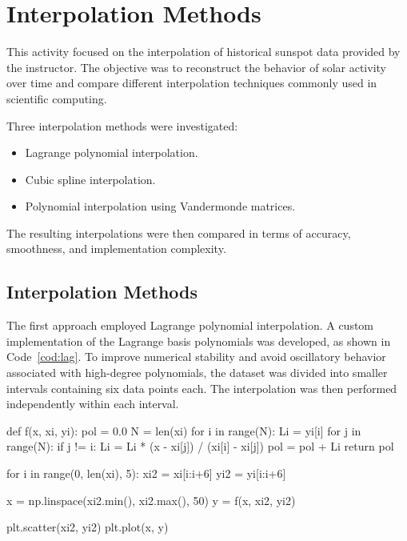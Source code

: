 \documentclass[../portafolio.tex]{subfiles}
\begin{document}
\section{Interpolation Methods}


\medskip


This activity focused on the interpolation of historical sunspot data provided by the instructor. The objective was to reconstruct the behavior of solar activity over time and compare different interpolation techniques commonly used in scientific computing.

Three interpolation methods were investigated:
\begin{itemize}
    \item Lagrange polynomial interpolation.
    \item Cubic spline interpolation.
    \item Polynomial interpolation using Vandermonde matrices.
\end{itemize}
The resulting interpolations were then compared in terms of accuracy, smoothness, and implementation complexity.


\subsection{Interpolation Methods}

The first approach employed Lagrange polynomial interpolation. A custom implementation of the Lagrange basis polynomials was developed, as shown in Code~\ref{cod:lag}. To improve numerical stability and avoid oscillatory behavior associated with high-degree polynomials, the dataset was divided into smaller intervals containing six data points each. The interpolation was then performed independently within each interval.

\begin{listing}
\begin{pythoncode}
def f(x, xi, yi):
    pol = 0.0
    N = len(xi)
    for i in range(N):
        Li = yi[i]
        for j in range(N):
            if j != i:
                Li = Li * (x - xi[j]) / (xi[i] - xi[j])
        pol = pol + Li
    return pol

for i in range(0, len(xi), 5):
    xi2 = xi[i:i+6]
    yi2 = yi[i:i+6]

    x = np.linspace(xi2.min(), xi2.max(), 50)
    y = f(x, xi2, yi2)

    plt.scatter(xi2, yi2)
    plt.plot(x, y)
\end{pythoncode}
\caption{Lagrange polynomial interpolation.}
\label{cod:lag}
\end{listing}
\end{document}
